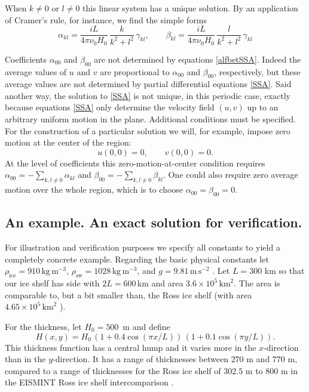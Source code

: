 \documentclass[12pt]{amsart}%
\theoremstyle{plain}
\theoremstyle{definition}
\newcommand{\rhoi}{\ensuremath{\rho_{\text{ice}}}}
\newcommand{\rhosw}{\ensuremath{\rho_{\text{sw}}}}
\begin{document}
When $k\ne 0$ or $l\ne 0$ this linear system has a unique solution.  By an application of Cramer's rule, for instance, we find the simple forms
\begin{equation}\label{alfbetSSA}
  \alpha_{kl} = \frac{i L}{4 \pi \nu_0 H_0}\, \frac{k}{k^2+l^2}\, \gamma_{kl}, \qquad  \beta_{kl} = \frac{i L}{4 \pi \nu_0 H_0}\, \frac{l}{k^2+l^2}\, \gamma_{kl} 
\end{equation}

Coefficients $\alpha_{00}$ and $\beta_{00}$ are not determined by equations \eqref{alfbetSSA}.  Indeed the average values of $u$ and $v$ are proportional to $\alpha_{00}$ and $\beta_{00}$, respectively, but these average values are not determined by partial differential equations \eqref{SSA}.  Said another way, the solution to \eqref{SSA} is not unique, in this periodic case, exactly because equations \eqref{SSA} only determine the velocity field $(u,v)$ up to an arbitrary uniform motion in the plane.  Additional conditions must be specified.  For the construction of a particular solution we will, for example, impose zero motion at the center of the region:
\begin{equation}\label{nomotioncenter}
  u(0,0) =0, \qquad v(0,0) = 0.
\end{equation}
At the level of coefficients this zero-motion-at-center condition requires $\alpha_{00} = - \sum_{k,l \ne 0} \alpha_{kl}$ and $\beta_{00} = - \sum_{k,l \ne 0} \beta_{kl}$.  One could also require zero average motion over the whole region, which is to choose $\alpha_{00} = \beta_{00} = 0$.

\subsection{An example. An exact solution for verification.}\label{subsect:ex1}  For illustration and verification purposes we specify all constants to yield a completely concrete example.  Regarding the basic physical constants let $\rhoi = 910\,\text{kg}\,\text{m}^{-3}$, $\rhosw = 1028\,\text{kg}\,\text{m}^{-3}$, and $g = 9.81\,\text{m}\,\text{s}^{-2}$ \cite{Paterson}.  Let $L=300$ km so that our ice shelf has side with $2L = 600$\,km and area $3.6 \times 10^5\,\text{km}^2$.  The area is comparable to, but a bit smaller than, the Ross ice shelf (with area $4.65 \times 10^5\,\text{km}^2$ \cite{MacAyealetal}).

For the thickness, let $H_0 = 500$~m and define
\begin{equation}\label{Hexact}
H(x,y) = H_0\, \left(1 + 0.4 \cos(\pi x/L)\right)\, \left(1 + 0.1 \cos(\pi y/L)\right).
\end{equation}
This thickness function has a central hump and it varies more in the $x$-direction than in the $y$-direction.  It has a range of thicknesses between $270$ m and $770$ m, compared to a range of thicknesses for the Ross ice shelf of $302.5$ m to $800$ m in the EISMINT Ross ice shelf intercomparison \cite{MacAyealetal}.
\end{document}
